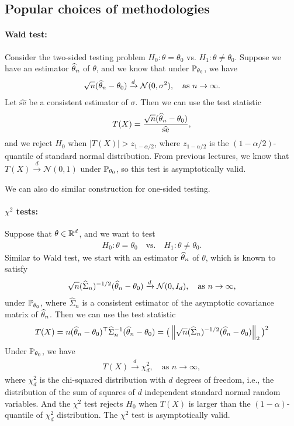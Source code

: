 \documentclass[11pt,letterpaper]{article}
\newcounter{lecture}
\numberwithin{assumption}{lecture}
\numberwithin{theorem}{lecture}
\numberwithin{proposition}{lecture}
\numberwithin{lemma}{lecture}
\numberwithin{claim}{lecture}
\numberwithin{corollary}{lecture}
\numberwithin{definition}{lecture}
\numberwithin{conjecture}{lecture}
\numberwithin{remark}{lecture}
\numberwithin{example}{lecture}
\numberwithin{equation}{lecture}
\begin{document}
\subsection{Popular choices of methodologies}

\paragraph{Wald test:} Consider the two-sided testing problem $H_0: \theta = \theta_0$ vs. $H_1: \theta \neq \theta_0$. Suppose we have an estimator $\widehat{\theta}_n$ of $\theta$, and we know that under ${\mathbb{P}}_{\theta_0}$, we have
\begin{align*}
  \sqrt{n} (\widehat{\theta}_n - \theta_0) \xrightarrow{d} \mathcal{N} (0, \sigma^2), \quad \text{as } n \to \infty.
\end{align*}
Let $\widehat{\mathrm{se}}$ be a consistent estimator of $\sigma$. Then we can use the test statistic
\begin{align*}
  T (X) = \frac{\sqrt{n} (\widehat{\theta}_n - \theta_0)}{\widehat{\mathrm{se}}},
\end{align*}
and we reject $H_0$ when $|T(X)| > z_{1 - \alpha/2}$, where $z_{1 - \alpha/2}$ is the $(1 - \alpha/2)$-quantile of standard normal distribution. From previous lectures, we know that $T(X) \xrightarrow{d} \mathcal{N} (0, 1)$ under ${\mathbb{P}}_{\theta_0}$, so this test is asymptotically valid.

We can also do similar construction for one-sided testing.

\paragraph{$\chi^2$ tests:} Suppose that $\theta \in \mathbb{R}^d$, and we want to test
\begin{align*}
  H_0: \theta = \theta_0 \quad \text{vs.} \quad H_1: \theta \neq \theta_0.
\end{align*}
Similar to Wald test, we start with an estimator $\widehat{\theta}_n$ of $\theta$, which is known to satisfy
\begin{align*}
  \sqrt{n} (\widehat{\Sigma}_n)^{-1/2} (\widehat{\theta}_n - \theta_0) \xrightarrow{d} \mathcal{N} (0, I_d), \quad \text{as } n \to \infty,
\end{align*}
under ${\mathbb{P}}_{\theta_0}$, where $\widehat{\Sigma}_n$ is a consistent estimator of the asymptotic covariance matrix of $\widehat{\theta}_n$. Then we can use the test statistic
\begin{align*}
  T (X) = n (\widehat{\theta}_n - \theta_0)^\top \widehat{\Sigma}_n^{-1} (\widehat{\theta}_n - \theta_0) = \big( \left\|  \sqrt{n} (\widehat{\Sigma}_n)^{-1/2} (\widehat{\theta}_n - \theta_0) \right\|_{2}\big)^2
\end{align*}
Under ${\mathbb{P}}_{\theta_0}$, we have
\begin{align*}
  T(X) \xrightarrow{d} \chi^2_d, \quad \text{as } n \to \infty,
\end{align*}
where $\chi^2_d$ is the chi-squared distribution with $d$ degrees of freedom, i.e., the distribution of the sum of squares of $d$ independent standard normal random variables. And the $\chi^2$ test rejects $H_0$ when $T(X)$ is larger than the $(1 - \alpha)$-quantile of $\chi^2_d$ distribution. The $\chi^2$ test is asymptotically valid.
\end{document}
